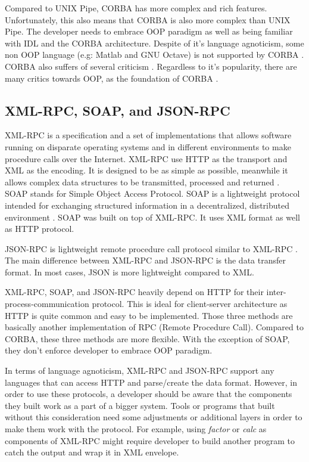 \documentclass[conference]{IEEEtran}
\begin{document}
Compared to UNIX Pipe, CORBA has more complex and rich features. Unfortunately, this also means 
that CORBA is also more complex than UNIX Pipe. The developer needs to embrace OOP 
paradigm as well as being familiar with IDL and the CORBA architecture. 
Despite of it's language agnoticism, some non OOP language (e.g: Matlab and GNU Octave) 
is not supported by CORBA \cite{feilhauer2016def}. CORBA also suffers of several 
criticism \cite{henning2006rise}. Regardless to it's popularity, there are many critics towards OOP, 
as the foundation of CORBA \cite{hadar2013intuition}.


\subsection{XML-RPC, SOAP, and JSON-RPC}

XML-RPC is a specification and a set of implementations that allows software running on 
disparate operating systems and in different environments to make procedure 
calls over the Internet. XML-RPC use HTTP as the transport and XML as the encoding.
It is designed to be as simple as possible, meanwhile it allows complex data structures to 
be transmitted, processed and returned \cite{xmlrpc}. SOAP stands for Simple Object Access Protocol. 
SOAP is a lightweight protocol intended for exchanging structured information in a decentralized, distributed 
environment \cite{soap}. SOAP was built on top of XML-RPC. It uses XML format as 
well as HTTP protocol.

JSON-RPC is lightweight remote procedure call protocol similar to XML-RPC 
\cite{jsonrpc}. The main difference between XML-RPC and JSON-RPC is the data transfer
format. In most cases, JSON is more lightweight compared to XML.

XML-RPC, SOAP, and JSON-RPC heavily depend on HTTP for their inter-process-communication 
protocol. This is ideal for client-server architecture as HTTP is quite common and
easy to be implemented. Those three methods are basically another implementation of RPC (Remote Procedure Call). 
Compared to CORBA, these three methods are more flexible. With the exception of SOAP,
they don't enforce developer to embrace OOP paradigm.

In terms of language agnoticism, XML-RPC and JSON-RPC support any languages that can
access HTTP and parse/create the data format. However, in order to use these protocols,
a developer should be aware that the components they built work as a part of a
bigger system. Tools or programs that built without this consideration need
some adjustments or additional layers in order to make them work with the protocol.
For example, using {\it{factor}} or {\it{calc}} as components of XML-RPC might require
developer to build another program to catch the output and wrap it in XML envelope.
\end{document}
